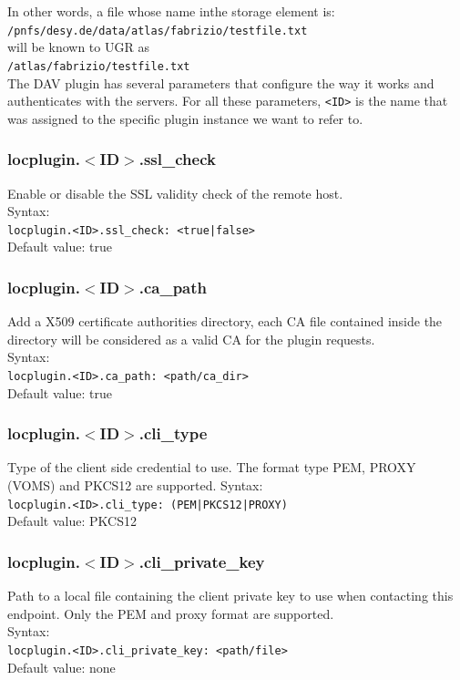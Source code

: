 \documentclass[12pt]{article} %
\begin{document}
In other words, a file whose name inthe storage element is:\\
\lstinline"/pnfs/desy.de/data/atlas/fabrizio/testfile.txt"\\

will be known to UGR as\\
\lstinline"/atlas/fabrizio/testfile.txt"\\

The DAV plugin has several parameters that configure the way it works and authenticates with the servers. For all these parameters, \lstinline"<ID>" is the name that was assigned to the specific plugin instance we want to refer to.

\subsubsection{locplugin.$<$ID$>$.ssl\_check}
Enable or disable the SSL validity check of the remote host.\\
Syntax:\\
\lstinline"locplugin.<ID>.ssl_check: <true|false>"\\
Default value: true\\
\subsubsection{locplugin.$<$ID$>$.ca\_path}
Add a X509 certificate authorities directory, each CA file contained inside the directory will be considered as a valid CA for the plugin requests.\\
Syntax:\\
\lstinline"locplugin.<ID>.ca_path: <path/ca_dir>"\\
Default value: true\\
\subsubsection{locplugin.$<$ID$>$.cli\_type}
Type of the client side credential to use. The format type PEM, PROXY (VOMS) and PKCS12 are supported.
Syntax:\\
\lstinline"locplugin.<ID>.cli_type: (PEM|PKCS12|PROXY)"\\
Default value: PKCS12\\
\subsubsection{locplugin.$<$ID$>$.cli\_private\_key}
Path to a local file containing the client private key to use when contacting this endpoint. Only the PEM and proxy format are supported.\\
Syntax:\\
\lstinline"locplugin.<ID>.cli_private_key: <path/file>"\\
Default value: none\\
\end{document}
